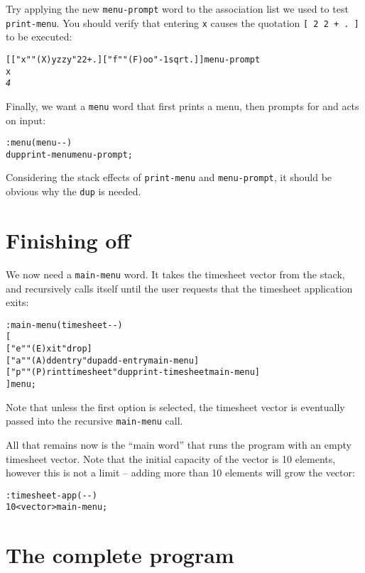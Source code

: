 \documentclass[english]{book}
\begin{document}
Try applying the new \texttt{menu-prompt} word to the association list we used to test \texttt{print-menu}. You should verify that entering \texttt{x} causes the quotation \texttt{{[} 2 2 + . {]}} to be executed:

\begin{alltt}
{[} {[} "x" "(X)yzzy" 2 2 + . {]} {[} "f" "(F)oo" -1 sqrt . {]} {]} menu-prompt
x
\emph{4}
\end{alltt}

Finally, we want a \texttt{menu} word that first prints a menu, then prompts for and acts on input:

\begin{alltt}
: menu ( menu -{}- )
    dup print-menu menu-prompt ;
\end{alltt}

Considering the stack effects of \texttt{print-menu} and \texttt{menu-prompt}, it should be obvious why the \texttt{dup} is needed.

\section{Finishing off}

We now need a \texttt{main-menu} word. It takes the timesheet vector from the stack, and recursively calls itself until the user requests that the timesheet application exits:

\begin{alltt}
: main-menu ( timesheet -{}- )
    {[}
        {[} "e" "(E)xit" drop {]}
        {[} "a" "(A)dd entry" dup add-entry main-menu {]}
        {[} "p" "(P)rint timesheet" dup print-timesheet main-menu {]}
    {]} menu ;
\end{alltt}

Note that unless the first option is selected, the timesheet vector is eventually passed into the recursive \texttt{main-menu} call.

All that remains now is the ``main word'' that runs the program with an empty timesheet vector. Note that the initial capacity of the vector is 10 elements, however this is not a limit -- adding more than 10 elements will grow the vector:

\begin{alltt}
: timesheet-app ( -{}- )
    10 <vector> main-menu ;
\end{alltt}

\section{The complete program}
\end{document}
